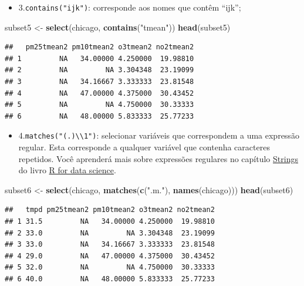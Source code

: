 \documentclass[]{book}
\newenvironment{Shaded}{\begin{snugshade}}{\end{snugshade}}
\newcommand{\KeywordTok}[1]{\textcolor[rgb]{0.13,0.29,0.53}{\textbf{#1}}}
\newcommand{\NormalTok}[1]{#1}
\newcommand{\StringTok}[1]{\textcolor[rgb]{0.31,0.60,0.02}{#1}}
\providecommand{\tightlist}{%
  \setlength{\itemsep}{0pt}\setlength{\parskip}{0pt}}
\begin{document}
\begin{itemize}
\tightlist
\item
  3.\texttt{contains("ijk")}: corresponde aos nomes que contêm ``ijk'';
\end{itemize}

\begin{Shaded}
\begin{Highlighting}[]
\NormalTok{subset5 <-}\StringTok{ }\KeywordTok{select}\NormalTok{(chicago, }\KeywordTok{contains}\NormalTok{(}\StringTok{"tmean"}\NormalTok{))}
\KeywordTok{head}\NormalTok{(subset5)}
\end{Highlighting}
\end{Shaded}

\begin{verbatim}
##   pm25tmean2 pm10tmean2 o3tmean2 no2tmean2
## 1         NA   34.00000 4.250000  19.98810
## 2         NA         NA 3.304348  23.19099
## 3         NA   34.16667 3.333333  23.81548
## 4         NA   47.00000 4.375000  30.43452
## 5         NA         NA 4.750000  30.33333
## 6         NA   48.00000 5.833333  25.77233
\end{verbatim}

\begin{itemize}
\tightlist
\item
  4.\texttt{matches("(.)\textbackslash{}\textbackslash{}1")}: selecionar variáveis que correspondem a uma expressão regular. Esta corresponde a qualquer variável que contenha caracteres repetidos. Você aprenderá mais sobre expressões regulares no capítulo \href{https://r4ds.had.co.nz/strings.html}{Strings} do livro \href{https://r4ds.had.co.nz/}{R for data science}.
\end{itemize}

\begin{Shaded}
\begin{Highlighting}[]
\NormalTok{subset6 <-}\StringTok{ }\KeywordTok{select}\NormalTok{(chicago, }\KeywordTok{matches}\NormalTok{(}\KeywordTok{c}\NormalTok{(}\StringTok{".m."}\NormalTok{), }\KeywordTok{names}\NormalTok{(chicago)))}
\KeywordTok{head}\NormalTok{(subset6)}
\end{Highlighting}
\end{Shaded}

\begin{verbatim}
##   tmpd pm25tmean2 pm10tmean2 o3tmean2 no2tmean2
## 1 31.5         NA   34.00000 4.250000  19.98810
## 2 33.0         NA         NA 3.304348  23.19099
## 3 33.0         NA   34.16667 3.333333  23.81548
## 4 29.0         NA   47.00000 4.375000  30.43452
## 5 32.0         NA         NA 4.750000  30.33333
## 6 40.0         NA   48.00000 5.833333  25.77233
\end{verbatim}
\end{document}

